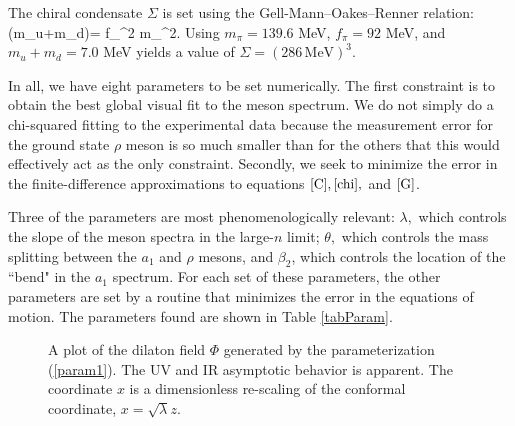 The chiral condensate $\Sigma$ is set using the Gell-Mann--Oakes--Renner relation:
\be
(m_u+m_d)\Sigma = f_\pi^2 m_\pi^2.
\ee
Using $m_\pi = 139.6$ MeV, $f_\pi = 92 $ MeV, and $m_u+m_d = 7.0 $ MeV yields a value of $\Sigma = (286\, \mathrm{MeV})^3$.

In all, we have eight parameters to be set numerically. 
The first constraint is to obtain the best global visual fit to the meson spectrum. 
We do not simply do a chi-squared fitting to the experimental data because the measurement error for the ground state $\rho$ meson is so much smaller than for the others that this would effectively act as the only constraint. 
Secondly, we seek to minimize the error in the finite-difference approximations to equations $\ref{C}, \ref{chi},$ and $\ref{G}$. 

Three of the parameters are most phenomenologically relevant: $\lambda,$ which controls the slope of the meson spectra in the large-$n$ limit; $\theta,$ which controls the mass splitting between the $a_1$ and $\rho$ mesons, and $\beta_2$, which controls the location of the ``bend" in the $a_1$ spectrum.
For each set of these parameters, the other parameters are set by a routine that minimizes the error in the equations of motion. 
The parameters found are shown in Table \ref{tabParam}.

\begin{figure}[htb]
\caption{A plot of the dilaton field $\Phi$ generated by the parameterization (\ref{param1}).
The UV and IR asymptotic behavior is apparent.
The coordinate $x$ is a dimensionless re-scaling of the conformal coordinate, $x=\sqrt{\lambda}z$.}
\label{figDilaton}
\end{figure}

